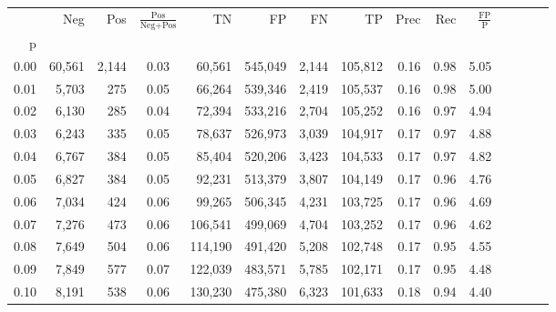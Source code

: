 \begin{tabular}{rrrcrrrrrrrrrrr}
\toprule
{} &     Neg &     Pos & $\frac{\text{Pos}}{\text{Neg}+\text{Pos}}$ &       TN &       FP &       FN &       TP &  Prec &   Rec & $\frac{\text{FP}}{\text{P}}$ \\
p    &         &         &                                            &          &          &          &          &       &       &                              \\
\midrule
0.00 &  60,561 &   2,144 &                                       0.03 &   60,561 &  545,049 &    2,144 &  105,812 &  0.16 &  0.98 &                         5.05 \\
0.01 &   5,703 &     275 &                                       0.05 &   66,264 &  539,346 &    2,419 &  105,537 &  0.16 &  0.98 &                         5.00 \\
0.02 &   6,130 &     285 &                                       0.04 &   72,394 &  533,216 &    2,704 &  105,252 &  0.16 &  0.97 &                         4.94 \\
0.03 &   6,243 &     335 &                                       0.05 &   78,637 &  526,973 &    3,039 &  104,917 &  0.17 &  0.97 &                         4.88 \\
0.04 &   6,767 &     384 &                                       0.05 &   85,404 &  520,206 &    3,423 &  104,533 &  0.17 &  0.97 &                         4.82 \\
0.05 &   6,827 &     384 &                                       0.05 &   92,231 &  513,379 &    3,807 &  104,149 &  0.17 &  0.96 &                         4.76 \\
0.06 &   7,034 &     424 &                                       0.06 &   99,265 &  506,345 &    4,231 &  103,725 &  0.17 &  0.96 &                         4.69 \\
0.07 &   7,276 &     473 &                                       0.06 &  106,541 &  499,069 &    4,704 &  103,252 &  0.17 &  0.96 &                         4.62 \\
0.08 &   7,649 &     504 &                                       0.06 &  114,190 &  491,420 &    5,208 &  102,748 &  0.17 &  0.95 &                         4.55 \\
0.09 &   7,849 &     577 &                                       0.07 &  122,039 &  483,571 &    5,785 &  102,171 &  0.17 &  0.95 &                         4.48 \\
0.10 &   8,191 &     538 &                                       0.06 &  130,230 &  475,380 &    6,323 &  101,633 &  0.18 &  0.94 &                         4.40 \\

\end{tabular}
